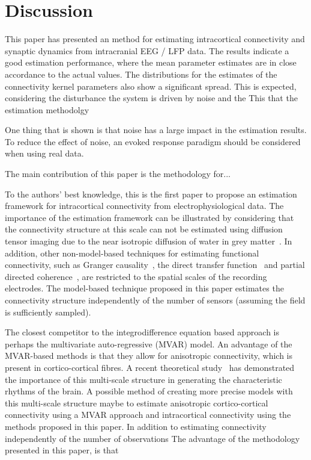 \documentclass[10pt,a4paper]{article}
\begin{document}
\section{Discussion}\label{DiscussionSection}

This paper has presented an method for estimating intracortical connectivity and synaptic dynamics from intracranial EEG / LFP data. The results indicate a good estimation performance, where the mean parameter estimates are in close accordance to the actual values. The distributions for the estimates of the connectivity kernel parameters also show a significant spread. This is expected, considering the disturbance  the system is driven by noise and the This that the estimation methodolgy 


One thing that is shown is that noise has a large impact in the estimation results. To reduce the effect of noise, an evoked response paradigm should be considered when using real data. 

The main contribution of this paper is the methodology for...

To the authors' best knowledge, this is the first paper to propose an estimation framework for intracortical connectivity from electrophysiological data. The importance of the estimation framework can be illustrated by considering that the connectivity structure at this scale can not be estimated using diffusion tensor imaging due to the near isotropic diffusion of water in grey matter~\cite{Assaf2008}. In addition, other non-model-based techniques for estimating functional connectivity, such as Granger causality~\cite{Hesse2003}, the direct transfer function~\cite{Kaminski1991} and partial directed coherence~\cite{Sameshima1999}, are restricted to the spatial scales of the recording electrodes. The model-based technique proposed in this paper estimates the connectivity structure independently of the number of sensors (assuming the field is sufficiently sampled). 

The closest competitor to the integrodifference equation based approach is perhaps the multivariate auto-regressive (MVAR) model. An advantage of the MVAR-based methods is that they allow for anisotropic connectivity, which is present in cortico-cortical fibres. A recent theoretical study~\cite{Jirsa2009} has demonstrated the importance of this multi-scale structure in generating the characteristic rhythms of the brain. A possible method of creating more precise models with this multi-scale structure maybe to estimate anisotropic cortico-cortical connectivity using a MVAR approach and intracortical connectivity using the methods proposed in this paper. In addition to estimating connectivity independently of the number of observations  The advantage of the methodology presented in this paper, is that 
\end{document}
